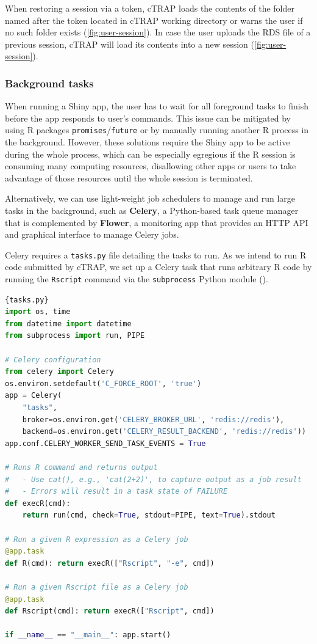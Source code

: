 When restoring a session via a token, cTRAP loads the contents of the folder named after the token located in cTRAP working directory or warns the user if no such folder exists (\autoref{fig:user-session}). In case the user uploads the RDS file of a previous session, cTRAP will load its contents into a new session (\autoref{fig:user-session}).

\subsubsection{Background tasks}
\label{subsec:background-tasks}

When running a Shiny app, the user has to wait for all foreground tasks to finish before the app responds to user's commands. This issue can be mitigated by using R packages \texttt{promises}/\texttt{future} or by manually running another R process in the background. However, these solutions require the Shiny app to be active during the whole process, which can be especially egregious if the R session is consuming many computing resources, disallowing other apps or users to take advantage of those resources until the whole session is terminated.

Alternatively, we can use light-weight job schedulers to manage and run large tasks in the background, such as  \textbf{Celery}, a Python-based task queue manager that is complemented by \textbf{Flower}, a monitoring app that provides an HTTP API and graphical interface to manage Celery jobs.

Celery requires a \texttt{tasks.py} file detailing the tasks to run. As we intend to run R code submitted by cTRAP, we set up a Celery task that runs arbitrary R code by running the \texttt{Rscript} command via the \texttt{subprocess} Python module ().

\begin{lstlisting}[language=python,caption=An example \texttt{tasks.py} file to run R commands or Rscript files via Celery.,label={lst:tasks.py},morekeywords={import},keywordstyle=\bfseries]{tasks.py}
import os, time
from datetime import datetime
from subprocess import run, PIPE

# Celery configuration
from celery import Celery
os.environ.setdefault('C_FORCE_ROOT', 'true')
app = Celery(
    "tasks",
    broker=os.environ.get('CELERY_BROKER_URL', 'redis://redis'),
    backend=os.environ.get('CELERY_RESULT_BACKEND', 'redis://redis'))
app.conf.CELERY_WORKER_SEND_TASK_EVENTS = True

# Runs R command and returns output
#   - Use cat(), e.g., 'cat(2+2)', to capture output as a job result
#   - Errors will result in a task state of FAILURE
def execR(cmd):
    return run(cmd, check=True, stdout=PIPE, text=True).stdout

# Run a given R expression as a Celery job
@app.task
def R(cmd): return execR(["Rscript", "-e", cmd])

# Run a given Rscript file as a Celery job
@app.task
def Rscript(cmd): return execR(["Rscript", cmd])

if __name__ == "__main__": app.start()
\end{lstlisting}

